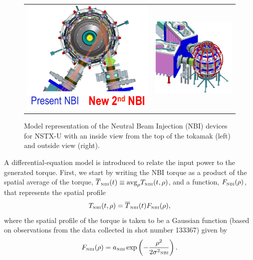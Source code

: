 \documentclass[12pt]{iopart}
\begin{document}
\begin{figure}
\begin{tabular}{cc}
\includegraphics[width=0.5\linewidth]{imene_figs/pic_NBI1} &
\includegraphics[width=0.4\linewidth]{imene_figs/pic_NBI2}
\end{tabular}
\caption{Model representation of the Neutral Beam Injection (NBI) devices for NSTX-U with an inside view from the top of the tokamak (left) and outside view (right). }
\label{NBI_pics}
\end{figure}


A differential-equation model is introduced to relate the input power to the generated torque.  First, we start by writing the NBI torque as a product of the spatial average of the torque, $\overline{T}_\textrm{\tiny{NBI}}(t) \equiv \textrm{avg}_\rho T_\textrm{\tiny{NBI}}(t,\rho)$, and a function, $F_\textrm{\tiny{NBI}}(\rho)$, that represents the spatial profile
\begin{equation}
   T_\textrm{\tiny{NBI}}(t,\rho) = \overline{T}_\textrm{\tiny{NBI}}(t) F_\textrm{\tiny{NBI}}(\rho),
\label{eq5}
\end{equation}
where the spatial profile of the torque is taken to be a Gaussian function (based on observations from the data collected in shot number 133367) given by
\begin{equation}
F_\textrm{\tiny{NBI}}(\rho) = a_\textrm{\tiny{NBI}} \exp\left( - \frac{\rho^2}{2\sigma^2\textrm{\tiny{NBI}}}\right).
\label{eq6}
\end{equation}
\end{document}
